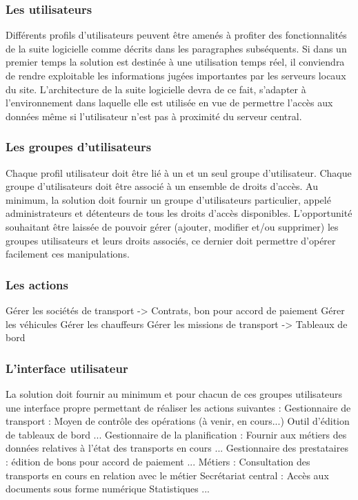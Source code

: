 \documentclass[11pt,fleqn]{book} %
\begin{document}
\subsubsection{Les utilisateurs}
Différents profils d'utilisateurs peuvent être amenés à profiter des fonctionnalités de la suite logicielle comme décrits dans les paragraphes subséquents. 
Si dans un premier temps la solution est destinée à une utilisation temps réel, il conviendra de rendre exploitable les informations jugées importantes par les serveurs locaux du site.
L'architecture de la suite logicielle devra de ce fait, s'adapter à l'environnement dans laquelle elle est utilisée en vue de permettre l'accès aux données même si l'utilisateur n'est pas à proximité du serveur central.

\subsubsection{Les groupes d'utilisateurs}
Chaque profil utilisateur doit être lié à un et un seul groupe d'utilisateur.
Chaque groupe d'utilisateurs doit être associé à un ensemble de droits d'accès.
Au minimum, la solution doit fournir un groupe d'utilisateurs particulier, appelé \og{}administrateurs\fg{} et détenteurs de tous les droits d'accès disponibles. L'opportunité souhaitant être laissée de pouvoir gérer (ajouter, modifier et/ou supprimer) les groupes utilisateurs et leurs droits associés, ce dernier doit permettre d'opérer facilement ces manipulations.

\subsubsection{Les actions}
Gérer les sociétés de transport -> Contrats, bon pour accord de paiement
Gérer les véhicules
Gérer les chauffeurs
Gérer les missions de transport -> Tableaux de bord

\subsubsection{L'interface utilisateur}
La solution doit fournir au minimum et pour chacun de ces groupes utilisateurs une interface propre permettant de réaliser les actions suivantes :
Gestionnaire de transport :
Moyen de contrôle des opérations (à venir, en cours...)
Outil d'édition de tableaux de bord
...
Gestionnaire de la planification :
Fournir aux métiers des données relatives à l'état des transports en cours
...
Gestionnaire des prestataires :
édition de bons pour accord de paiement
...
Métiers :
Consultation des transports en cours en relation avec le métier
Secrétariat central :
Accès aux documents sous forme numérique
Statistiques
...
\end{document}
